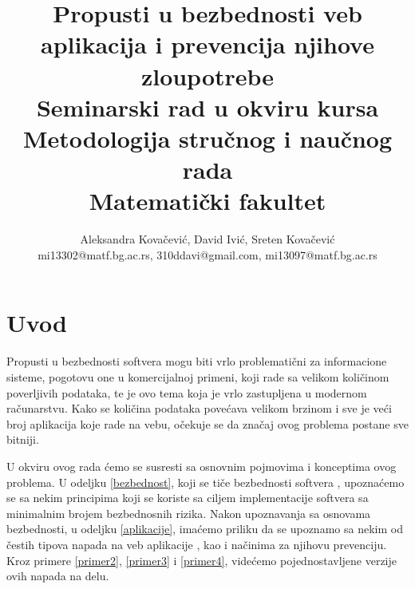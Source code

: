 \documentclass[a4paper]{article}
\begin{document}
\title{\vspace{-5ex}Propusti u bezbednosti veb aplikacija i prevencija njihove zloupotrebe\\ \small{Seminarski rad u okviru kursa\\Metodologija stručnog i naučnog rada\\ Matematički fakultet}}

\author{Aleksandra Kovačević, David Ivić, Sreten Kovačević\\ mi13302@matf.bg.ac.rs, 310ddavi@gmail.com, mi13097@matf.bg.ac.rs}

\maketitle


\tableofcontents

\newpage

\section{Uvod}

Propusti u bezbednosti softvera mogu biti vrlo problematični za informacione sisteme, pogotovu one u komercijalnoj primeni, koji rade sa velikom količinom poverljivih podataka, te je ovo tema koja je vrlo zastupljena u modernom računarstvu. Kako se količina podataka povećava velikom brzinom i sve je veći broj aplikacija koje rade na vebu, očekuje se da značaj ovog problema postane sve bitniji.

U okviru ovog rada ćemo se susresti sa osnovnim pojmovima i konceptima ovog problema. U odeljku \ref{bezbednost}, koji se tiče bezbednosti softvera \cite{BIS}, upoznaćemo se sa nekim principima koji se koriste sa ciljem implementacije softvera sa minimalnim brojem bezbednosnih rizika. Nakon upoznavanja sa osnovama bezbednosti, u odeljku \ref{aplikacije}, imaćemo priliku da se upoznamo sa nekim od čestih tipova napada na veb aplikacije \cite{SQL, XSS, AC}, kao i načinima za njihovu prevenciju. Kroz primere \ref{primer2}, \ref{primer3} i \ref{primer4}, videćemo pojednostavljene verzije ovih napada na delu.
\end{document}
